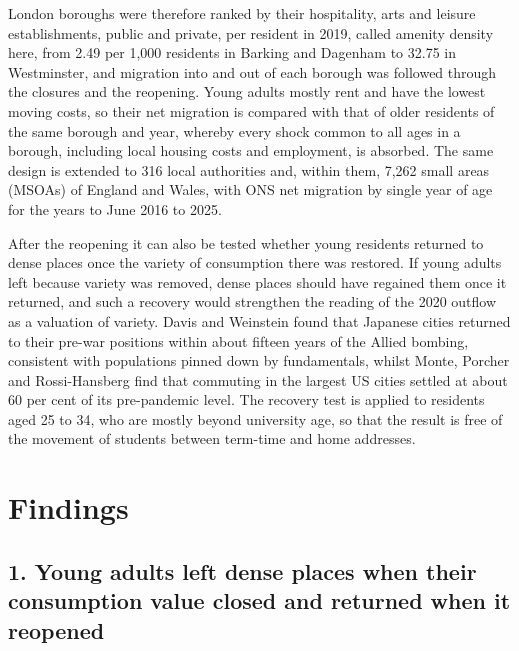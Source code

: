\documentclass[11pt,a4paper]{article}
\begin{document}
London boroughs were therefore ranked by their hospitality, arts and leisure establishments, public and private, per resident in 2019, called amenity density here, from 2.49 per 1,000 residents in Barking and Dagenham to 32.75 in Westminster, and migration into and out of each borough was followed through the closures and the reopening. Young adults mostly rent and have the lowest moving costs, so their net migration is compared with that of older residents of the same borough and year, whereby every shock common to all ages in a borough, including local housing costs and employment, is absorbed. The same design is extended to 316 local authorities and, within them, 7,262 small areas (MSOAs) of England and Wales, with ONS net migration by single year of age for the years to June 2016 to 2025.

After the reopening it can also be tested whether young residents returned to dense places once the variety of consumption there was restored. If young adults left because variety was removed, dense places should have regained them once it returned, and such a recovery would strengthen the reading of the 2020 outflow as a valuation of variety. Davis and Weinstein found that Japanese cities returned to their pre-war positions within about fifteen years of the Allied bombing, consistent with populations pinned down by fundamentals, whilst Monte, Porcher and Rossi-Hansberg find that commuting in the largest US cities settled at about 60 per cent of its pre-pandemic level. The recovery test is applied to residents aged 25 to 34, who are mostly beyond university age, so that the result is free of the movement of students between term-time and home addresses.

\section{Findings}

\subsection*{1. Young adults left dense places when their consumption value closed and returned when it reopened}
\end{document}
